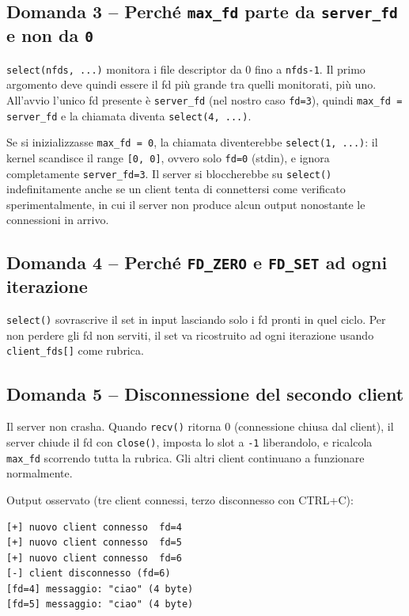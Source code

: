 \documentclass[a4paper,12pt]{article}
\begin{document}
\subsection*{Domanda 3 -- Perché \texttt{max\_fd} parte da \texttt{server\_fd} e non da \texttt{0}}

\texttt{select(nfds, ...)} monitora i file descriptor da 0 fino a \texttt{nfds-1}.
Il primo argomento deve quindi essere il fd più grande tra quelli monitorati, più uno.
All'avvio l'unico fd presente è \texttt{server\_fd} (nel nostro caso \texttt{fd=3}),
quindi \texttt{max\_fd = server\_fd} e la chiamata diventa \texttt{select(4, ...)}.

Se si inizializzasse \texttt{max\_fd = 0}, la chiamata diventerebbe \texttt{select(1, ...)}:
il kernel scandisce il range \texttt{[0, 0]}, ovvero solo \texttt{fd=0} (stdin), e ignora completamente
\texttt{server\_fd=3}. Il server si bloccherebbe su \texttt{select()} indefinitamente
anche se un client tenta di connettersi come verificato sperimentalmente, in cui
il server non produce alcun output nonostante le connessioni in arrivo.

\subsection*{Domanda 4 -- Perché \texttt{FD\_ZERO} e \texttt{FD\_SET} ad ogni iterazione}

\texttt{select()} sovrascrive il set in input lasciando solo i fd pronti in quel ciclo.
Per non perdere gli fd non serviti, il set va ricostruito ad ogni iterazione usando
\texttt{client\_fds[]} come rubrica.

\subsection*{Domanda 5 -- Disconnessione del secondo client}

Il server non crasha. Quando \texttt{recv()} ritorna 0 (connessione chiusa dal client),
il server chiude il fd con \texttt{close()}, imposta lo slot a \texttt{-1} liberandolo,
e ricalcola \texttt{max\_fd} scorrendo tutta la rubrica.
Gli altri client continuano a funzionare normalmente.

Output osservato (tre client connessi, terzo disconnesso con CTRL+C):
\begin{lstlisting}
[+] nuovo client connesso  fd=4
[+] nuovo client connesso  fd=5
[+] nuovo client connesso  fd=6
[-] client disconnesso (fd=6)
[fd=4] messaggio: "ciao" (4 byte)
[fd=5] messaggio: "ciao" (4 byte)
\end{lstlisting}
\end{document}
